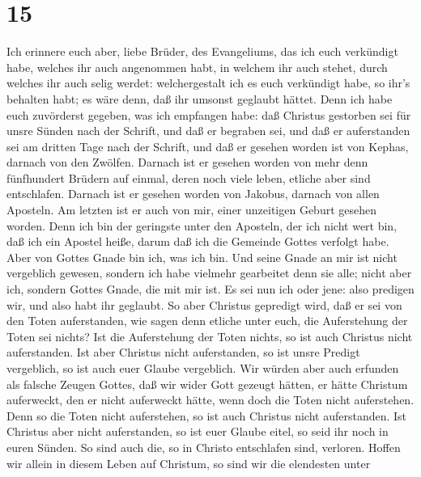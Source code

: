 \hypertarget{section-14}{%
\section{15}\label{section-14}}

 Ich erinnere euch aber, liebe Brüder, des Evangeliums, das
ich euch verkündigt habe, welches ihr auch angenommen habt, in welchem
ihr auch stehet,  durch welches ihr auch selig werdet:
welchergestalt ich es euch verkündigt habe, so ihr's behalten habt; es
wäre denn, daß ihr umsonst geglaubt hättet.  Denn ich habe
euch zuvörderst gegeben, was ich empfangen habe: daß Christus gestorben
sei für unsre Sünden nach der Schrift,  und daß er begraben
sei, und daß er auferstanden sei am dritten Tage nach der Schrift,
 und daß er gesehen worden ist von Kephas, darnach von den
Zwölfen.  Darnach ist er gesehen worden von mehr denn
fünfhundert Brüdern auf einmal, deren noch viele leben, etliche aber
sind entschlafen.  Darnach ist er gesehen worden von
Jakobus, darnach von allen Aposteln.  Am letzten ist er auch
von mir, einer unzeitigen Geburt gesehen worden.  Denn ich
bin der geringste unter den Aposteln, der ich nicht wert bin, daß ich
ein Apostel heiße, darum daß ich die Gemeinde Gottes verfolgt habe.
 Aber von Gottes Gnade bin ich, was ich bin. Und seine
Gnade an mir ist nicht vergeblich gewesen, sondern ich habe vielmehr
gearbeitet denn sie alle; nicht aber ich, sondern Gottes Gnade, die mit
mir ist.  Es sei nun ich oder jene: also predigen wir, und
also habt ihr geglaubt.  So aber Christus gepredigt wird,
daß er sei von den Toten auferstanden, wie sagen denn etliche unter
euch, die Auferstehung der Toten sei nichts?  Ist die
Auferstehung der Toten nichts, so ist auch Christus nicht auferstanden.
 Ist aber Christus nicht auferstanden, so ist unsre Predigt
vergeblich, so ist auch euer Glaube vergeblich.  Wir würden
aber auch erfunden als falsche Zeugen Gottes, daß wir wider Gott gezeugt
hätten, er hätte Christum auferweckt, den er nicht auferweckt hätte,
wenn doch die Toten nicht auferstehen.  Denn so die Toten
nicht auferstehen, so ist auch Christus nicht auferstanden.
 Ist Christus aber nicht auferstanden, so ist euer Glaube
eitel, so seid ihr noch in euren Sünden.  So sind auch die,
so in Christo entschlafen sind, verloren.  Hoffen wir
allein in diesem Leben auf Christum, so sind wir die elendesten unter

